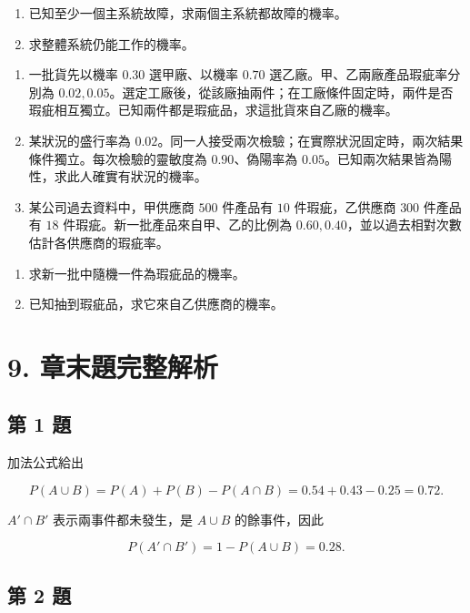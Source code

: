 \documentclass[11pt,a4paper]{article}
\begin{document}
\begin{enumerate}
\def\labelenumi{(\arabic{enumi})}
\item
  已知至少一個主系統故障，求兩個主系統都故障的機率。
\item
  求整體系統仍能工作的機率。
\end{enumerate}

\begin{enumerate}
\def\labelenumi{\arabic{enumi}.}
\setcounter{enumi}{13}
\item
  一批貨先以機率 \(0.30\) 選甲廠、以機率 \(0.70\) 選乙廠。甲、乙兩廠產品瑕疵率分別為 \(0.02,0.05\)。選定工廠後，從該廠抽兩件；在工廠條件固定時，兩件是否瑕疵相互獨立。已知兩件都是瑕疵品，求這批貨來自乙廠的機率。
\item
  某狀況的盛行率為 \(0.02\)。同一人接受兩次檢驗；在實際狀況固定時，兩次結果條件獨立。每次檢驗的靈敏度為 \(0.90\)、偽陽率為 \(0.05\)。已知兩次結果皆為陽性，求此人確實有狀況的機率。
\item
  某公司過去資料中，甲供應商 \(500\) 件產品有 \(10\) 件瑕疵，乙供應商 \(300\) 件產品有 \(18\) 件瑕疵。新一批產品來自甲、乙的比例為 \(0.60,0.40\)，並以過去相對次數估計各供應商的瑕疵率。
\end{enumerate}

\begin{enumerate}
\def\labelenumi{(\arabic{enumi})}
\item
  求新一批中隨機一件為瑕疵品的機率。
\item
  已知抽到瑕疵品，求它來自乙供應商的機率。
\end{enumerate}

\section{9. 章末題完整解析}\label{ux7ae0ux672bux984cux5b8cux6574ux89e3ux6790}

\subsection{第 1 題}\label{ux7b2c-1-ux984c}

加法公式給出

\[
P(A\cup B)=P(A)+P(B)-P(A\cap B)
=0.54+0.43-0.25
=\boxed{0.72}.
\]

\(A'\cap B'\) 表示兩事件都未發生，是 \(A\cup B\) 的餘事件，因此

\[
P(A'\cap B')=1-P(A\cup B)=\boxed{0.28}.
\]

\subsection{第 2 題}\label{ux7b2c-2-ux984c}
\end{document}

